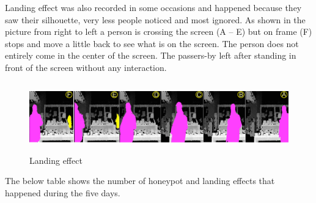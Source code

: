 Landing effect was also recorded in some occasions and happened because they saw their silhouette, very less people noticed and most ignored. As shown in the picture from right to left a person is crossing the screen (A – E) but on frame (F) stops and move a little back to see what is on the screen. The person does not entirely come in the center of the screen. The passers-by left after standing in front of the screen without any interaction.

\begin{minipage}{0.95\textwidth}
\begin{flushright}
\begin{figure}[H]
    \centering
    \includegraphics[width=\textwidth,height=30mm]{Figures/8/mobile_inter_findings/effects/landing}
    \caption{Landing effect}
    \label{fig:mobile_landingeffect}
\end{figure}
\end{flushright}
\end{minipage}



The below table shows the number of honeypot and landing effects that happened during the five days.

\begin{table}[H]
\caption{Mobile Interactive Landing and honeypot effect}
\label{tab:landingandhonypot_mobile}
\centering
{}
\end{table}



